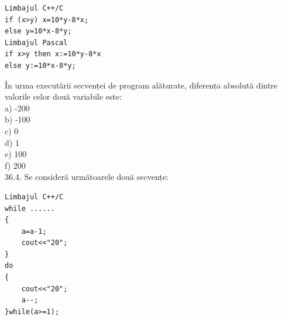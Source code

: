 \begin{itemize}
\begin{enumerate}
\begin{verbatim}
Limbajul C++/C
if (x>y) x=10*y-8*x;
else y=10*x-8*y;
Limbajul Pascal
if x>y then x:=10*y-8*x
else y:=10*x-8*y;
\end{verbatim}
În urma executării secvenței de program alăturate, diferența absolută dintre valorile celor două variabile este:
\\
a) -200
\\
b) -100
\\
c) 0
\\
d) 1
\\
e) 100
\\
f) 200
\\
36.4. Se consideră următoarele două secvențe:
\begin{verbatim}
Limbajul C++/C
while ......
{
    a=a-1;
    cout<<"20";
}
do
{
    cout<<"20";
    a--;
}while(a>=1);
\end{verbatim}


\end{enumerate}
\end{itemize}
